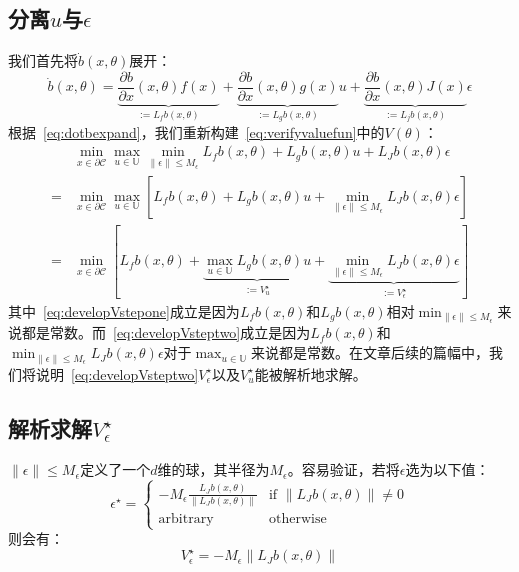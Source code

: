 \subsection{分离$u$与$\epsilon$}
我们首先将$\dot{b}(x, \theta)$展开：
\begin{equation}\label{eq:dotbexpand}
    \dot{b}(x, \theta) = \underbrace{\frac{\partial b}{\partial x}(x, \theta) f(x)}_{:=L_f b(x, \theta)} + 
    \underbrace{\frac{\partial b}{\partial x}(x, \theta) g(x)}_{:= L_g b(x, \theta)} u +
    \underbrace{\frac{\partial b}{\partial x}(x, \theta) J(x)}_{:= L_j b(x, \theta)} \epsilon
\end{equation}
根据~\eqref{eq:dotbexpand}，我们重新构建~\eqref{eq:verifyvaluefun}中的$V(\theta)$：
\begin{align}
    & \min_{x \in \partial \mathcal{C}} \max_{u \in \mathbb{U}} \min_{\parallel \epsilon \parallel \le M_\epsilon} L_fb(x, \theta) + L_gb(x, \theta)u + L_Jb(x, \theta)\epsilon \nonumber \\
    = & \min_{x \in \partial \mathcal{C}} \max_{u \in \mathbb{U}} \left[ L_fb(x, \theta) + L_gb(x, \theta)u + \min_{\parallel \epsilon \parallel \le M_\epsilon}L_Jb(x, \theta)\epsilon \right] \label{eq:developVstepone} \\
    = & \min_{x \in \partial \mathcal{C}} \left[ L_fb(x, \theta) + \underbrace{\max_{u \in \mathbb{U}} L_gb(x, \theta)u}_{:=V_u^\star} + \underbrace{\min_{\parallel \epsilon \parallel \le M_\epsilon}L_Jb(x, \theta)\epsilon}_{:=V_\epsilon^\star} \right] \label{eq:developVsteptwo}
\end{align}
其中~\eqref{eq:developVstepone}成立是因为$L_fb(x, \theta)$和$L_gb(x, \theta)$相对$\min_{\parallel \epsilon \parallel \le M_\epsilon}$来说都是常数。而~\eqref{eq:developVsteptwo}成立是因为$L_fb(x, \theta)$和$\min_{\parallel \epsilon \parallel \le M_\epsilon} L_Jb(x, \theta) \epsilon$对于$\max_{u \in \mathbb{U}}$来说都是常数。在文章后续的篇幅中，我们将说明~\eqref{eq:developVsteptwo}$V_\epsilon^\star$以及$V_u^\star$能被解析地求解。

\subsection{解析求解$V_\epsilon^\star$}
$\parallel \epsilon \parallel \le M_\epsilon$定义了一个$d$维的球，其半径为$M_\epsilon$。容易验证，若将$\epsilon$选为以下值：
\begin{equation}
    \epsilon^\star = \begin{cases}
        - M_\epsilon \frac{L_Jb(x, \theta)}{\parallel L_Jb(x, \theta) \parallel} & \text{if } \parallel L_Jb(x, \theta) \parallel \ne 0 \\
        \text{arbitrary} & \text{otherwise}
    \end{cases}
\end{equation}
则会有：
\begin{equation}\label{eq:Vepsstar}
    V^\star_\epsilon = -M_\epsilon \parallel L_Jb(x, \theta) \parallel
\end{equation}

